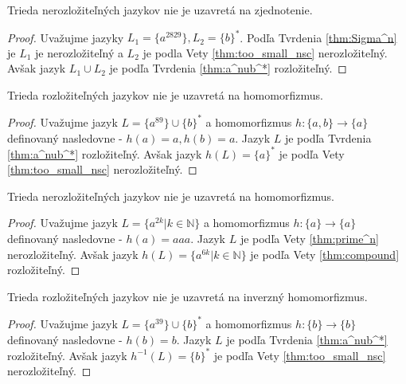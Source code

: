\begin{proposition}
Trieda nerozložiteľných jazykov nie je uzavretá na zjednotenie.
\end{proposition}

\begin{proof}
Uvažujme jazyky $ L_1 = \lbrace a^{2829} \rbrace, L_2 = \lbrace b \rbrace^* $. Podľa Tvrdenia \ref{thm:Sigma^n} je $ L_1 $ je nerozložiteľný a $ L_2 $ je podla Vety \ref{thm:too_small_nsc} nerozložiteľný. Avšak jazyk $ L_1 \cup L_2 $ je podľa Tvrdenia \ref{thm:a^nub^*} rozložiteľný.
\end{proof}

\begin{proposition}
Trieda rozložiteľných jazykov nie je uzavretá na homomorfizmus.
\end{proposition}

\begin{proof}
Uvažujme jazyk $ L = \lbrace a^{89} \rbrace \cup \lbrace b \rbrace^* $ a homomorfizmus $ h : \lbrace a,b \rbrace \rightarrow \lbrace a \rbrace $ definovaný nasledovne - $ h(a) = a, h(b) = a $. Jazyk $ L $ je podľa Tvrdenia \ref{thm:a^nub^*} rozložiteľný. Avšak jazyk $ h(L) = \lbrace a \rbrace^*$ je podľa Vety \ref{thm:too_small_nsc} nerozložiteľný.
\end{proof}

\begin{proposition}
Trieda nerozložiteľných jazykov nie je uzavretá na homomorfizmus.
\end{proposition}

\begin{proof}
Uvažujme jazyk $ L = \lbrace a^{2k} | k \in \mathbb{N} \rbrace $ a homomorfizmus $ h : \lbrace a \rbrace \rightarrow \lbrace a \rbrace $ definovaný nasledovne - $ h(a) = aaa $. Jazyk $ L $ je podľa Vety \ref{thm:prime^n} nerozložiteľný. Avšak jazyk $ h(L) = \lbrace a^{6k} | k \in \mathbb{N} \rbrace $ je podľa Vety \ref{thm:compound} rozložiteľný.
\end{proof}

\begin{proposition}
Trieda rozložiteľných jazykov nie je uzavretá na inverzný homomorfizmus.
\end{proposition}

\begin{proof}
Uvažujme jazyk $ L = \lbrace a^{39} \rbrace \cup \lbrace b \rbrace^* $ a homomorfizmus $ h : \lbrace b \rbrace \rightarrow \lbrace b \rbrace $ definovaný nasledovne - $ h(b) = b $. Jazyk $ L $ je podľa Tvrdenia \ref{thm:a^nub^*} rozložiteľný. Avšak jazyk $ h^{-1}(L) = \lbrace b \rbrace^*$ je podľa Vety \ref{thm:too_small_nsc} nerozložiteľný.
\end{proof}

